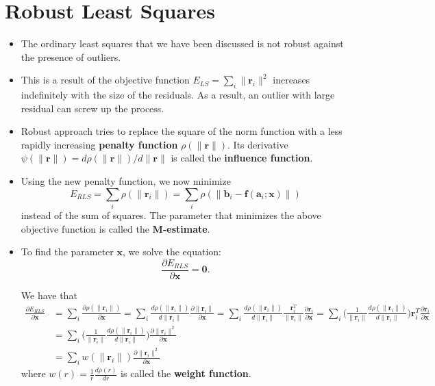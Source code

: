 \documentclass[10pt]{article}
\newcommand{\ve}[1]{\mathbf{#1}}
\begin{document}
  \section{Robust Least Squares}
  
  \begin{itemize}
    \item The ordinary least squares that we have been discussed
      is not robust against the presence of outliers. 
      
    \item This is a result of the objective function 
      $E_{LS} = \sum_i \| \ve{r}_i \|^2$
      increases indefinitely with the size of the residuals.
      As a result,  an outlier with large residual can screw up the process.
      
    \item Robust approach tries to replace the square of the
      norm function with a less rapidly increasing {\bf penalty function}
      $\rho(\ve{\|r\|})$. Its derivative $\psi(\| \ve{r} \|)
      = d \rho(\| \ve{r} \|) / d\| \ve{r} \|$ is called
      the {\bf influence function}.        
      
    \item Using the new penalty function, we now minimize
    $$E_{RLS} = \sum_i \rho(\| \ve{r}_i \| )
    = \sum_i \rho(\| \ve{b}_i - \ve{f}(\ve{a}_i; \ve{x}) \| )$$
    instead of the sum of squares.
    The parameter that minimizes the above objective
    function is called the {\bf M-estimate}.
    
    \item To find the parameter $\ve{x}$, we solve the equation:
      $$\frac{\partial E_{RLS}}{\partial \ve{x}} = \ve{0}.$$
    
      We have that
      \begin{align*}
        \frac{\partial E_{RLS}}{\partial \ve{x}}
        &= \sum_i \frac{\partial \rho(\| \ve{r}_i \|)}{\partial \ve{x}}
        = \sum_i \frac{d \rho(\| \ve{r}_i \|)}{d \| \ve{r}_i \|}
          \frac{\partial \| \ve{r}_i \|}{\partial \ve{x}}
        = \sum_i \frac{d \rho(\| \ve{r}_i \|)}{d \| \ve{r}_i \|}
          \frac{\ve{r}_i^T}{\| \ve{r}_i \|} \frac{\partial \ve{r}_i }{\partial \ve{x}}
        = \sum_i \bigg( \frac{1}{\| \ve{r}_i \|} \frac{d \rho(\| \ve{r}_i \|)}{d \| \ve{r}_i \|} \bigg) \ve{r}_i^T \frac{\partial \ve{r}_i }{\partial \ve{x}}\\
        &= \sum_i \bigg( \frac{1}{\| \ve{r}_i \|} \frac{d \rho(\| \ve{r}_i \|)}{d \| \ve{r}_i \|} \bigg)
          \frac{\partial \| \ve{r}_i \|^2 }{\partial \ve{x}}\\
        &= \sum_i w(\| \ve{r}_i \|)
          \frac{\partial \| \ve{r}_i \|^2 }{\partial \ve{x}}
      \end{align*}
      where $w(r) = \frac{1}{r}\frac{d \rho(r)}{dr}$ is called
      the {\bf weight function}.
      

\end{itemize}
\end{document}
